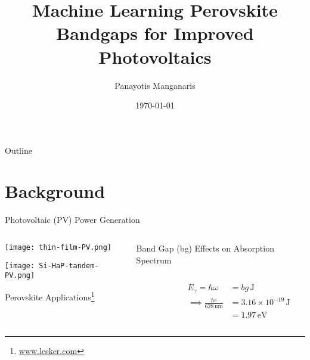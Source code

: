\documentclass[10pt, aspectratio=169, presentation]{beamer}
\institute[Mannodi Group]{\large{}
\inst{1} Purdue Materials Engineering\\Advisor Arun Mannodi-Kanakkithodi
}
\author{\large{}Panayotis Manganaris\inst{1}}
\date{\today}
\title{\Huge{}Machine Learning Perovskite Bandgaps for Improved Photovoltaics}
\begin{document}
\maketitle
\begin{frame}{Outline}
\tableofcontents
\end{frame}

\section{Background}
\label{sec:orgc2eb295}
\begin{frame}[label={sec:org8f7bb02}]{Photovoltaic (PV) Power Generation}
\begin{columns}
\begin{column}{0.3\columnwidth}
\begin{center}
\texttt{[image: thin-film-PV.png]}
\end{center}
\begin{center}
\texttt{[image: Si-HaP-tandem-PV.png]}
\end{center}

\tiny{}\center{}Perovskite Applications\footnote{\tiny{}\href{https://www.lesker.com/newweb/ped/applications/perovskite-research.cfm }{www.lesker.com}}
\end{column}

\begin{column}{0.7\columnwidth}
\begin{block}{Band Gap (bg) Effects on Absorption Spectrum}
\begin{columns}
\begin{column}{0.5\columnwidth}
 
\begin{center}

\end{center}
\end{column}

\begin{column}{0.5\columnwidth}
\begin{align*}
E_\gamma = \hbar\omega &= bg\,\si{\joule} \\
\implies \frac{hc}{628\,\si{\nano\meter}} &= 3.16\times{}10^{-19}\,\si{\joule}\\
&= 1.97\,\si{\electronvolt}
\end{align*}
\end{column}
\end{columns}
\end{block}


\end{column}
\end{columns}
\end{frame}
\end{document}

